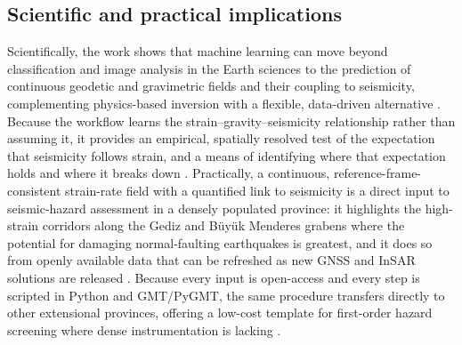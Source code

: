 \documentclass[pdflatex,sn-mathphys-num]{sn-jnl}%
\theoremstyle{thmstyleone}%
\theoremstyle{thmstyletwo}%
\theoremstyle{thmstylethree}%
\begin{document}
\subsection{Scientific and practical implications}\label{sec:implications}
Scientifically, the work shows that machine learning can move beyond classification and
image analysis in the Earth sciences to the prediction of continuous geodetic and
gravimetric fields and their coupling to seismicity, complementing physics-based
inversion with a flexible, data-driven alternative
\cite{Bergen2019,Reichstein2019,Lemenkova202606,Kong2019,DeVries2018,Mignan2019,Ross2018,Dramsch2020,MousaviBeroza2023}. Because the workflow learns
the strain--gravity--seismicity relationship rather than assuming it, it provides an
empirical, spatially resolved test of the expectation that seismicity follows strain,
and a means of identifying where that expectation holds and where it breaks down
\cite{MousaviBeroza2023,Bahrami2021,Lemenkova202403,Kong2019,Reichstein2019}. Practically, a continuous,
reference-frame-consistent strain-rate field with a quantified link to seismicity is a
direct input to seismic-hazard assessment in a densely populated province: it highlights
the high-strain corridors along the Gediz and B\"{u}y\"{u}k Menderes grabens where the
potential for damaging normal-faulting earthquakes is greatest, and it does so from
openly available data that can be refreshed as new GNSS and InSAR solutions are released
\cite{Kurt2023,Lazecky2020,Lemenkova202606,Ergintav2023,Weiss2020}. Because every input is
open-access and every step is scripted in Python and GMT/PyGMT, the same procedure
transfers directly to other extensional provinces, offering a low-cost template for
first-order hazard screening where dense instrumentation is lacking
\cite{Wessel2019,Bird2003,Lemenkova202206,Stadler2010,Sandwell2014,PerouseVernant2012}.
\end{document}
